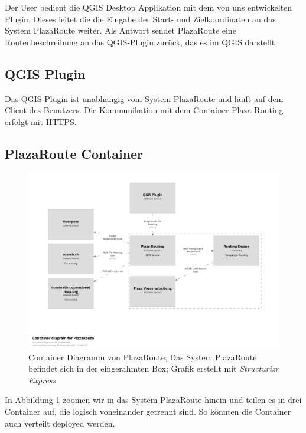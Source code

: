 Der User bedient die QGIS Desktop Applikation mit dem von uns entwickelten Plugin. Dieses leitet die die Eingabe der Start- und Zielkoordinaten an das System PlazaRoute weiter. Als Antwort sendet PlazaRoute eine Routenbeschreibung an das QGIS-Plugin zurück, das es im QGIS darstellt.

\subsection{QGIS Plugin}
\label{architektur:QGIS Plugin}
Das QGIS-Plugin ist unabhängig vom System PlazaRoute und läuft auf dem Client des Benutzers. Die Kommunikation mit dem Container Plaza Routing erfolgt mit HTTPS.

\subsection{PlazaRoute Container}
\label{architektur:PlazaRoute Container}

\begin{figure}[ht]
    \centering
    \includegraphics[width=1\linewidth]{projectdoc/img/container_diagram.png}
    \caption[Container Diagramm]{Container Diagramm von PlazaRoute; Das System PlazaRoute befindet sich in der eingerahmten Box; Grafik erstellt mit \emph{Structurizr Express}\cite{structurizr}}
    \label{fig:container_diagram}
    \end{figure}    

In Abbildung \ref{fig:container_diagram} zoomen wir in das System PlazaRoute hinein und teilen es in drei Container auf, die logisch voneinander getrennt sind. So könnten die Container auch verteilt deployed werden.

